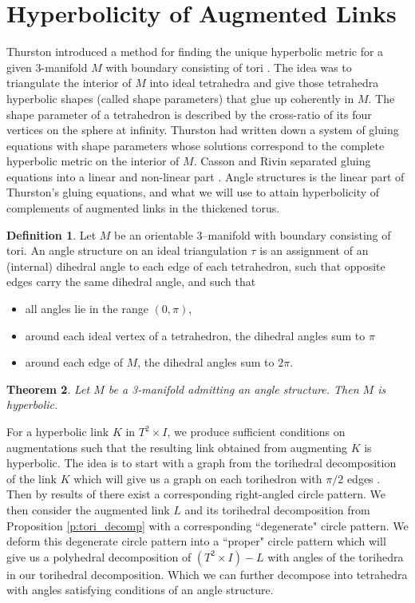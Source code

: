 \documentclass[11pt]{amsart}
\theoremstyle{plain}
\newtheorem{theorem}{Theorem}[section]
\theoremstyle{definition}
\newtheorem{define}[theorem]{Definition}
\begin{document}
\section{Hyperbolicity of Augmented Links}
Thurston introduced a method for finding the unique hyperbolic metric for a given 3-manifold $M$ with boundary consisting of tori \cite{Thurston}. The idea was to triangulate the interior of $M$ into ideal tetrahedra and give those tetrahedra hyperbolic shapes (called shape parameters) that glue up coherently in $M$. The shape parameter of a tetrahedron is described by the cross-ratio of its four vertices on the sphere at infinity. Thurston had written down a system of gluing equations with shape parameters whose solutions correspond to the complete hyperbolic metric on the interior of $M$. Casson and Rivin separated gluing equations into a linear and non-linear part \cite{Casson-Rivin}. Angle structures is the linear part of Thurston's gluing equations, and what we will use to attain hyperbolicity of complements of augmented links in the thickened torus. 

\begin{define}
Let $M$ be an orientable 3–manifold with boundary consisting of tori. An angle structure on an ideal triangulation $\tau$ is an assignment of an (internal) dihedral angle to each edge of each tetrahedron, such that opposite
edges carry the same dihedral angle, and such that
\begin{itemize}
\item all angles lie in the range $(0,\pi)$,
\item around each ideal vertex of a tetrahedron, the dihedral angles sum to $\pi$
\item around each edge of $M$, the dihedral angles sum to $2\pi$.
\end{itemize}
\end{define}

\begin{theorem}\cite{Casson-Rivin}\label{thm:Casson-Rivin}
Let $M$ be a 3-manifold admitting an angle structure. Then $M$ is hyperbolic.
\end{theorem}

For a hyperbolic link $K$ in $T^2 \times I$, we produce sufficient conditions on augmentations such that the resulting link obtained from augmenting $K$ is hyperbolic. The idea is to start with a graph from the torihedral decomposition of the link $K$ which will give us a graph on each torihedron with $\pi/2$ edges \cite{CKP2}. Then by results of \cite{BandS} there exist a corresponding right-angled circle pattern. We then consider the augmented link $L$ and its torihedral decomposition from Proposition \ref{p:tori_decomp} with a corresponding ``degenerate" circle pattern. We deform this degenerate circle pattern into a ``proper" circle pattern which will give us a polyhedral decomposition of $(T^2 \times I)-L$ with angles of the torihedra in our torihedral decomposition. Which we can further decompose into tetrahedra with angles satisfying conditions of an angle structure. 
\end{document}
